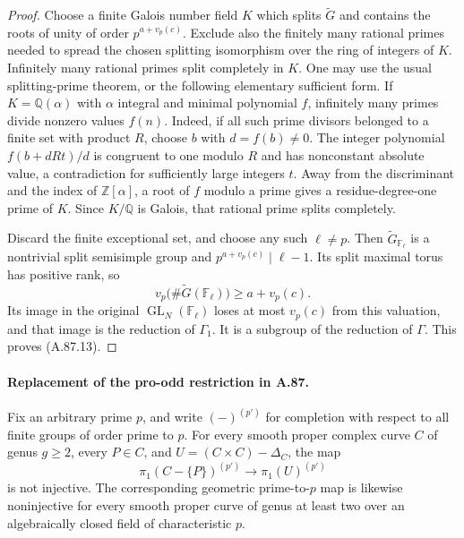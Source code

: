 \documentclass[11pt]{article}
\begin{document}
\begin{proof}
Choose a finite Galois number field \(K\) which splits
\(\widetilde G\) and contains the roots of unity of order
\(p^{a+v_p(c)}\). Exclude also the finitely many rational
primes needed to spread the chosen splitting isomorphism
over the ring of integers of \(K\). Infinitely many rational primes split
completely in \(K\). One may use the usual splitting-prime
theorem, or the following elementary sufficient form. If
\(K=\mathbb Q(\alpha)\) with \(\alpha\) integral and minimal
polynomial \(f\), infinitely many primes divide nonzero values
\(f(n)\). Indeed, if all such prime divisors belonged to a
finite set with product \(R\), choose \(b\) with
\(d=f(b)\ne0\). The integer polynomial
\(f(b+dRt)/d\) is congruent to one modulo \(R\) and has
nonconstant absolute value, a contradiction for sufficiently
large integers \(t\). Away from the discriminant and the
index of \(\mathbb Z[\alpha]\), a root of \(f\) modulo a
prime gives a residue-degree-one prime of \(K\). Since
\(K/\mathbb Q\) is Galois, that rational prime splits completely.

Discard the finite exceptional set, and choose any such
\(\ell\ne p\). Then \(\widetilde G_{\mathbb F_\ell}\)
is a nontrivial split semisimple group and
\(p^{a+v_p(c)}\mid\ell-1\). Its split maximal torus has
positive rank, so
\[
       v_p\bigl(\#\widetilde G(\mathbb F_\ell)\bigr)
                          \geq a+v_p(c).
\]
Its image in the original \(\operatorname{GL}_N(\mathbb F_\ell)\)
loses at most \(v_p(c)\) from this valuation, and that image is
the reduction of \(\Gamma_1\). It is a subgroup of the
reduction of \(\Gamma\). This proves (A.87.13).
\end{proof}

\paragraph{Replacement of the pro-odd restriction in A.87.}
Fix an arbitrary prime \(p\), and write \((-)^{(p')}\) for
completion with respect to all finite groups of order prime
to \(p\). For every smooth proper complex curve \(C\) of
genus \(g\geq2\), every \(P\in C\), and
\(U=(C\times C)-\Delta_C\), the map
\[
       \pi_1(C-\{P\})^{(p')}
                 \longrightarrow \pi_1(U)^{(p')}
                                                        \tag{A.87.14}
\]
is not injective. The corresponding geometric prime-to-\(p\)
map is likewise noninjective for every smooth proper curve of
genus at least two over an algebraically closed field of
characteristic \(p\).
\end{document}
